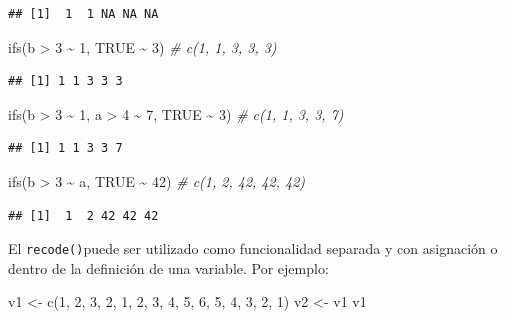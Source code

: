 \documentclass[
]{book}
\newenvironment{Shaded}{\begin{snugshade}}{\end{snugshade}}
\newcommand{\CommentTok}[1]{\textcolor[rgb]{0.56,0.35,0.01}{\textit{#1}}}
\newcommand{\ConstantTok}[1]{\textcolor[rgb]{0.00,0.00,0.00}{#1}}
\newcommand{\DecValTok}[1]{\textcolor[rgb]{0.00,0.00,0.81}{#1}}
\newcommand{\FunctionTok}[1]{\textcolor[rgb]{0.00,0.00,0.00}{#1}}
\newcommand{\NormalTok}[1]{#1}
\newcommand{\OtherTok}[1]{\textcolor[rgb]{0.56,0.35,0.01}{#1}}
\newcommand{\SpecialCharTok}[1]{\textcolor[rgb]{0.00,0.00,0.00}{#1}}
\begin{document}
\begin{verbatim}
## [1]  1  1 NA NA NA
\end{verbatim}

\begin{Shaded}
\begin{Highlighting}[]
\FunctionTok{ifs}\NormalTok{(b }\SpecialCharTok{\textgreater{}} \DecValTok{3} \SpecialCharTok{\textasciitilde{}} \DecValTok{1}\NormalTok{, }\ConstantTok{TRUE} \SpecialCharTok{\textasciitilde{}} \DecValTok{3}\NormalTok{)  }\CommentTok{\# c(1, 1, 3, 3, 3)}
\end{Highlighting}
\end{Shaded}

\begin{verbatim}
## [1] 1 1 3 3 3
\end{verbatim}

\begin{Shaded}
\begin{Highlighting}[]
\FunctionTok{ifs}\NormalTok{(b }\SpecialCharTok{\textgreater{}} \DecValTok{3} \SpecialCharTok{\textasciitilde{}} \DecValTok{1}\NormalTok{, a }\SpecialCharTok{\textgreater{}} \DecValTok{4} \SpecialCharTok{\textasciitilde{}} \DecValTok{7}\NormalTok{, }\ConstantTok{TRUE} \SpecialCharTok{\textasciitilde{}} \DecValTok{3}\NormalTok{)  }\CommentTok{\# c(1, 1, 3, 3, 7)}
\end{Highlighting}
\end{Shaded}

\begin{verbatim}
## [1] 1 1 3 3 7
\end{verbatim}

\begin{Shaded}
\begin{Highlighting}[]
\FunctionTok{ifs}\NormalTok{(b }\SpecialCharTok{\textgreater{}} \DecValTok{3} \SpecialCharTok{\textasciitilde{}}\NormalTok{ a, }\ConstantTok{TRUE} \SpecialCharTok{\textasciitilde{}} \DecValTok{42}\NormalTok{)  }\CommentTok{\# c(1, 2, 42, 42, 42)}
\end{Highlighting}
\end{Shaded}

\begin{verbatim}
## [1]  1  2 42 42 42
\end{verbatim}

El \texttt{recode()}puede ser utilizado como funcionalidad separada y con asignación o dentro de la definición de una variable. Por ejemplo:

\begin{Shaded}
\begin{Highlighting}[]
\NormalTok{v1 }\OtherTok{\textless{}{-}} \FunctionTok{c}\NormalTok{(}\DecValTok{1}\NormalTok{, }\DecValTok{2}\NormalTok{, }\DecValTok{3}\NormalTok{, }\DecValTok{2}\NormalTok{, }\DecValTok{1}\NormalTok{, }\DecValTok{2}\NormalTok{, }\DecValTok{3}\NormalTok{, }\DecValTok{4}\NormalTok{, }\DecValTok{5}\NormalTok{, }\DecValTok{6}\NormalTok{, }\DecValTok{5}\NormalTok{, }\DecValTok{4}\NormalTok{, }\DecValTok{3}\NormalTok{, }\DecValTok{2}\NormalTok{, }\DecValTok{1}\NormalTok{)}
\NormalTok{v2 }\OtherTok{\textless{}{-}}\NormalTok{ v1}
\NormalTok{v1}
\end{Highlighting}
\end{Shaded}
\end{document}
